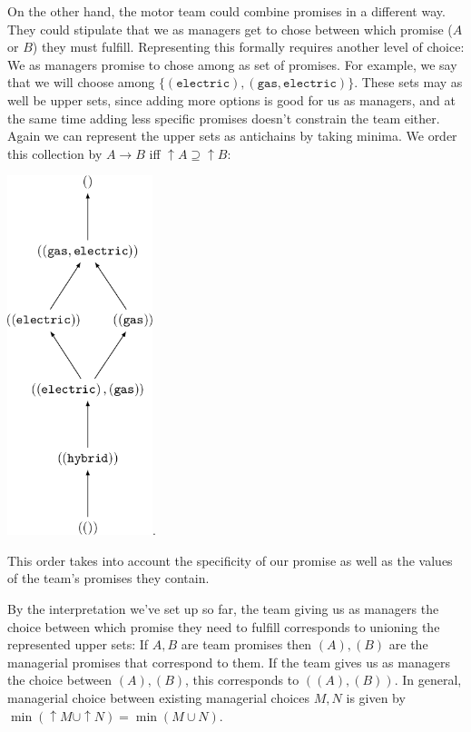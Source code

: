 \documentclass[12pt]{article}
\theoremstyle{definition}
\theoremstyle{plain}
\theoremstyle{plain}
\theoremstyle{plain}
\theoremstyle{plain}
\theoremstyle{remark}
\theoremstyle{remark}
\begin{document}
On the other hand, the motor team could combine promises in a different way. They could stipulate that we as managers get to chose between which promise ($A$ or $B$) they must fulfill. Representing this formally requires another level of choice: We as managers promise to chose among as set of promises. For example, we say that we will choose among $\{(\mathtt{electric}), \mathtt{(gas,electric)}\}$. These sets may as well be upper sets, since adding more options is good for us as managers, and at the same time adding less specific promises doesn't constrain the team either. Again we can represent the upper sets as antichains by taking minima. We order this collection by $A \rightarrow B$ iff $\uparrow A \supseteq \uparrow B$: 
\begin{center}
	\includegraphics[width=120pt]{section6/6.1/anti_anti_motors.png}.
\end{center}
This order takes into account the specificity of our promise as well as the values of the team's promises they contain.

By the interpretation we've set up so far, the team giving us as managers the choice between which promise they need to fulfill corresponds to unioning the represented upper sets: If $A, B$ are team promises then $(A),(B)$ are the managerial promises that correspond to them. If the team gives us as managers the choice between $(A),(B)$, this corresponds to $((A),(B))$. In general, managerial choice between existing managerial choices $M,N$ is given by $\min(\uparrow M \cup \uparrow N) = \min(M \cup N)$.
\end{document}
